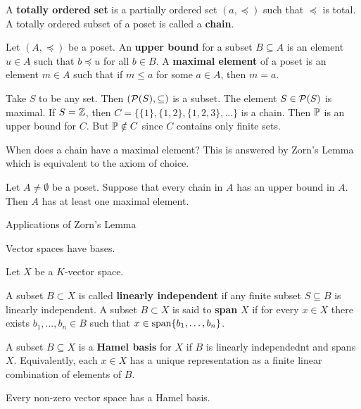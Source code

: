 \begin{defn}
  A \textbf{totally ordered set} is a partially ordered set $(a,\preceq)$ such that $\preceq$ is total.
  A totally ordered subset of a poset is called a \textbf{chain}.
\end{defn}

\begin{defn}
  Let $(A,\preceq)$ be a poset.
  An \textbf{upper bound} for a subset $B \subseteq A$ is an element $u \in A$ such that $b \preceq u$ for all $b \in B$.
  A \textbf{maximal element} of a poset is an element $m \in A$ such that if $m \leq a$ for some $a \in A$, then $m=a$.
\end{defn}

\begin{exam}
  Take $S$ to be any set. Then $(\mathcal{P}(S),\subseteq)$ is a subset.
  The element $S \in \mathcal{P}(S)$ is maximal.
  If $S=\mathbb{Z}$, then $C=\{\{1\},\{1,2\},\{1,2,3\},\ldots\}$ is a chain.
  Then $\mathbb{P}$ is an upper bound for $C$.
  But $\mathbb{P} \notin C$ since $C$ contains only finite sets.
\end{exam}

When does a chain have a maximal element?
This is answered by Zorn's Lemma which is equivalent to the axiom of choice.

\begin{thm}
  Let $A \neq \emptyset$ be a poset.
  Suppose that every chain in $A$ has an upper bound in $A$.
  Then $A$ has at least one maximal element.
\end{thm}

Applications of Zorn's Lemma

Vector spaces have bases.

\begin{defn}
  Let $X$ be a $K$-vector space.
  \begin{enum}
    \io A subset $B \subset X$ is called \textbf{linearly independent} if any finite subset $S \subseteq B$ is linearly independent.
    \io A subset $B \subset X$ is said to \textbf{span} $X$ if for every $x \in X$ there exists $b_1,\ldots,b_n \in B$ such that $x \in \operatorname{span}\{b_1,\ldots,b_n\}$.
  \end{enum}
  A subset $B \subseteq X$ is a \textbf{Hamel basis} for $X$ if $B$ is linearly independednt and spans $X$.
  Equivalently, each $x \in X$ has a unique representation as a finite linear combination of elements of $B$.
\end{defn}

\begin{thm}
  Every non-zero vector space has a Hamel basis.
\end{thm}
